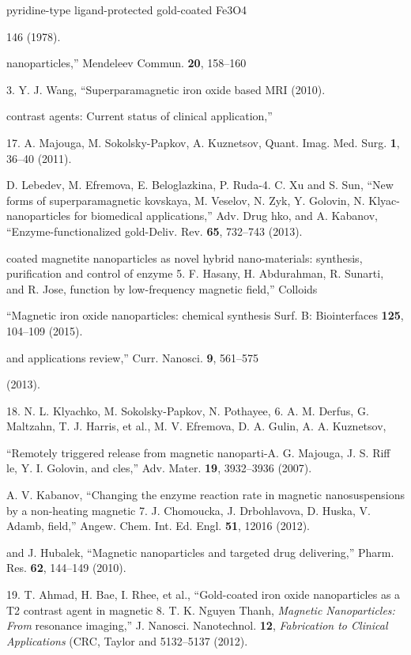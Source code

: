 \documentclass[12pt,a4paper]{article}
\begin{document}
pyridine-type ligand-protected gold-coated Fe3O4

146 (1978).

nanoparticles,'' Mendeleev Commun. \textbf{20}, 158--160

3. Y. J. Wang, ``Superparamagnetic iron oxide based MRI (2010).

contrast agents: Current status of clinical application,''

17. A. Majouga, M. Sokolsky-Papkov, A. Kuznetsov, Quant. Imag. Med.
Surg. \textbf{1}, 36--40 (2011).

D. Lebedev, M. Efremova, E. Beloglazkina, P. Ruda-4. C. Xu and S. Sun,
``New forms of superparamagnetic kovskaya, M. Veselov, N. Zyk, Y.
Golovin, N. Klyac-nanoparticles for biomedical applications,'' Adv. Drug
hko, and A. Kabanov, ``Enzyme-functionalized gold-Deliv. Rev.
\textbf{65}, 732--743 (2013).

coated magnetite nanoparticles as novel hybrid nano-materials:
synthesis, purification and control of enzyme 5. F. Hasany, H.
Abdurahman, R. Sunarti, and R. Jose, function by low-frequency magnetic
field,'' Colloids

``Magnetic iron oxide nanoparticles: chemical synthesis Surf. B:
Biointerfaces \textbf{125}, 104--109 (2015).

and applications review,'' Curr. Nanosci. \textbf{9}, 561--575

(2013).

18. N. L. Klyachko, M. Sokolsky-Papkov, N. Pothayee, 6. A. M. Derfus, G.
Maltzahn, T. J. Harris, et al., M. V. Efremova, D. A. Gulin, A. A.
Kuznetsov,

``Remotely triggered release from magnetic nanoparti-A. G. Majouga, J.
S. Riff le, Y. I. Golovin, and cles,'' Adv. Mater. \textbf{19},
3932--3936 (2007).

A. V. Kabanov, ``Changing the enzyme reaction rate in magnetic
nanosuspensions by a non-heating magnetic 7. J. Chomoucka, J.
Drbohlavova, D. Huska, V. Adamb, field,'' Angew. Chem. Int. Ed. Engl.
\textbf{51}, 12016 (2012).

and J. Hubalek, ``Magnetic nanoparticles and targeted drug delivering,''
Pharm. Res. \textbf{62}, 144--149 (2010).

19. T. Ahmad, H. Bae, I. Rhee, et al., ``Gold-coated iron oxide
nanoparticles as a T2 contrast agent in magnetic 8. T. K. Nguyen Thanh,
\emph{Magnetic Nanoparticles: From} resonance imaging,'' J. Nanosci.
Nanotechnol. \textbf{12}, \emph{Fabrication to Clinical Applications}
(CRC, Taylor and 5132--5137 (2012).
\end{document}
